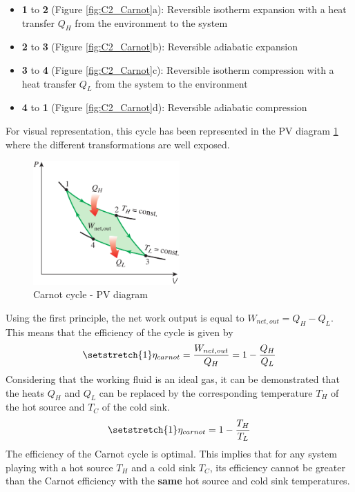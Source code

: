 \begin{itemize}
\item \textbf{1} to \textbf{2} (Figure \ref{fig:C2_Carnot}a): Reversible isotherm expansion with a heat transfer $Q_H$ from the environment to the system
\item \textbf{2} to \textbf{3} (Figure \ref{fig:C2_Carnot}b): Reversible  adiabatic expansion
\item \textbf{3} to \textbf{4} (Figure \ref{fig:C2_Carnot}c): Reversible isotherm compression with a heat transfer $Q_L$ from the system to the environment
\item \textbf{4} to \textbf{1} (Figure \ref{fig:C2_Carnot}d): Reversible adiabatic compression
\end{itemize}
For visual representation, this cycle has been represented in the PV diagram \ref{fig:C2_CarnotPV} where the different transformations are well exposed.
\begin{figure}[h]
\centering
\includegraphics[width=0.5\textwidth]{Carnot_PV.png}
\caption{Carnot cycle - PV diagram \cite{2015}}
\label{fig:C2_CarnotPV}
\end{figure}

Using the first principle, the net work output is equal to $W_{net,out}=Q_H-Q_L$. This means that the efficiency of the cycle is given by
\begin{equation}
\setstretch{1}
\eta_{carnot} = \frac{W_{net,out}}{Q_H} = 1 - \frac{Q_H}{Q_L}
\end{equation} 
Considering that the working fluid is an ideal gas, it can be demonstrated that the heats $Q_H$ and $Q_L$ can be replaced by the corresponding temperature $T_H$ of the hot source and $T_C$ of the cold sink.
\begin{equation}
\setstretch{1}
\eta_{carnot}=1-\frac{T_H}{T_L}\label{eq:C2_eff_carnot}
\end{equation} 
The efficiency of the Carnot cycle is optimal. This implies that for any system playing with a hot source $T_H$ and a cold sink $T_C$, its efficiency cannot be greater than the Carnot efficiency with the \textbf{same} hot source and cold sink temperatures.

